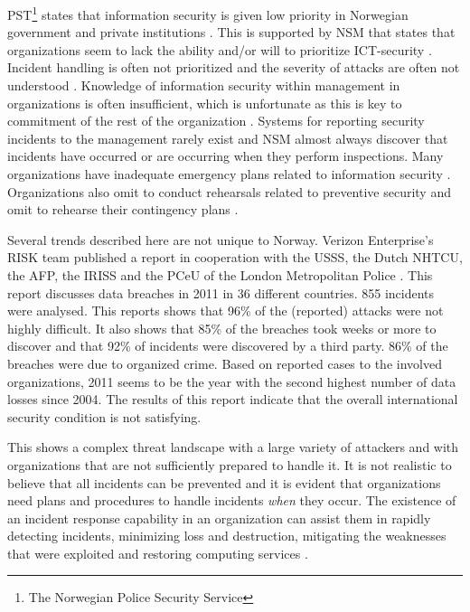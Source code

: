 PST\footnote{The Norwegian Police Security Service} states that information security is given low priority in Norwegian government and private institutions \cite{PSTvurdering}. This is supported by \acs{NSM} that states that organizations seem to lack the ability and/or will to prioritize ICT-security \cite{NSMmelding}. Incident handling is often not prioritized and the severity of attacks are often not understood \cite{NorCERT2Kvartal2012}. Knowledge of information security within management in organizations is often insufficient, which is unfortunate as this is key to commitment of the rest of the organization \cite{NorCERT3Kvartal2012}. Systems for reporting security incidents to the management rarely exist and \acs{NSM} almost always discover that incidents have occurred or are occurring when they perform inspections. Many organizations have inadequate emergency plans related to information security \cite{NSMRapport}. Organizations also omit to conduct rehearsals related to preventive security and omit to rehearse their contingency plans \cite{NSMRapport2012}.

Several trends described here are not unique to Norway. Verizon Enterprise's RISK team published a report in cooperation with the \ac{USSS}, the Dutch \ac{NHTCU}, the \ac{AFP}, the \ac{IRISS} and the \ac{PCeU} of the London Metropolitan Police \cite{VerizonReport}. This report discusses data breaches in 2011 in 36 different countries. 855 incidents were analysed. This reports shows that 96\% of the (reported) attacks were not highly difficult. It also shows that 85\% of the breaches took weeks or more to discover and that 92\% of incidents were discovered by a third party. 86\% of the breaches were due to organized crime. Based on reported cases to the involved organizations, 2011 seems to be the year with the second highest number of data losses since 2004. The results of this report indicate that the overall international security condition is not satisfying.

This shows a complex threat landscape with a large variety of attackers and with organizations that are not sufficiently prepared to handle it. It is not realistic to believe that all incidents can be prevented and it is evident that organizations need plans and procedures to handle incidents \textit{when} they occur. The existence of an incident response capability in an organization can assist them in rapidly detecting incidents, minimizing loss and destruction, mitigating the weaknesses that were exploited and restoring computing services \cite{nist800-61}. 

